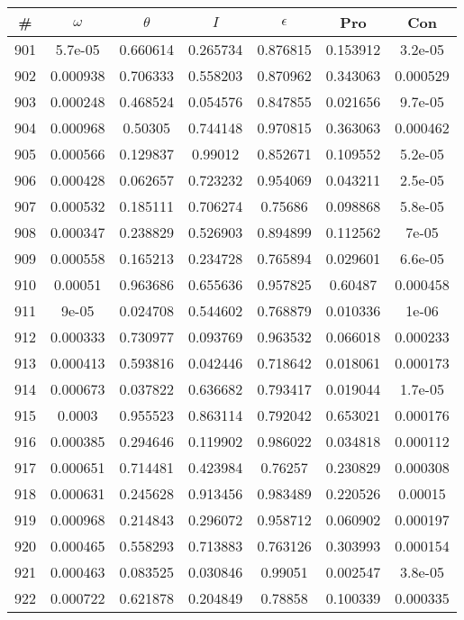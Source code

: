 \newpage
\begin{table}
\begin{tabular}{c|c|c|c|c|c|c}
\# & $\omega$ & $\theta$ & $I$ & $\epsilon$ & Pro & Con\\
\hline
901 & 5.7e-05 & 0.660614 & 0.265734 & 0.876815 & 0.153912 & 3.2e-05\\
902 & 0.000938 & 0.706333 & 0.558203 & 0.870962 & 0.343063 & 0.000529\\
903 & 0.000248 & 0.468524 & 0.054576 & 0.847855 & 0.021656 & 9.7e-05\\
904 & 0.000968 & 0.50305 & 0.744148 & 0.970815 & 0.363063 & 0.000462\\
905 & 0.000566 & 0.129837 & 0.99012 & 0.852671 & 0.109552 & 5.2e-05\\
906 & 0.000428 & 0.062657 & 0.723232 & 0.954069 & 0.043211 & 2.5e-05\\
907 & 0.000532 & 0.185111 & 0.706274 & 0.75686 & 0.098868 & 5.8e-05\\
908 & 0.000347 & 0.238829 & 0.526903 & 0.894899 & 0.112562 & 7e-05\\
909 & 0.000558 & 0.165213 & 0.234728 & 0.765894 & 0.029601 & 6.6e-05\\
910 & 0.00051 & 0.963686 & 0.655636 & 0.957825 & 0.60487 & 0.000458\\
911 & 9e-05 & 0.024708 & 0.544602 & 0.768879 & 0.010336 & 1e-06\\
912 & 0.000333 & 0.730977 & 0.093769 & 0.963532 & 0.066018 & 0.000233\\
913 & 0.000413 & 0.593816 & 0.042446 & 0.718642 & 0.018061 & 0.000173\\
914 & 0.000673 & 0.037822 & 0.636682 & 0.793417 & 0.019044 & 1.7e-05\\
915 & 0.0003 & 0.955523 & 0.863114 & 0.792042 & 0.653021 & 0.000176\\
916 & 0.000385 & 0.294646 & 0.119902 & 0.986022 & 0.034818 & 0.000112\\
917 & 0.000651 & 0.714481 & 0.423984 & 0.76257 & 0.230829 & 0.000308\\
918 & 0.000631 & 0.245628 & 0.913456 & 0.983489 & 0.220526 & 0.00015\\
919 & 0.000968 & 0.214843 & 0.296072 & 0.958712 & 0.060902 & 0.000197\\
920 & 0.000465 & 0.558293 & 0.713883 & 0.763126 & 0.303993 & 0.000154\\
921 & 0.000463 & 0.083525 & 0.030846 & 0.99051 & 0.002547 & 3.8e-05\\
922 & 0.000722 & 0.621878 & 0.204849 & 0.78858 & 0.100339 & 0.000335\\

\end{tabular}
\end{table}
